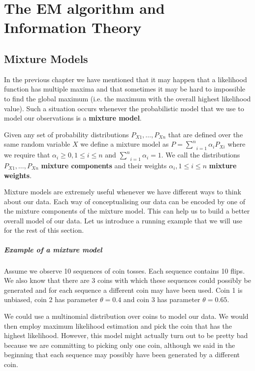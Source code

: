 \chapter{The EM algorithm and Information Theory}

\section{Mixture Models}\label{sec:mixtureModels}

In the previous chapter we have mentioned that it may happen that a likelihood function has multiple 
maxima and that sometimes it may be hard to impossible to find the global maximum (i.e. the maximum
with the overall highest likelihood value). Such a situation occurs whenever the probabilistic model
that we use to model our observations is a \textbf{mixture model}.

\begin{Definition}\label{def:mixtureModel}
Given any set of probability distributions $ P_{X1}, \ldots, P_{Xn} $ that are defined over the same
random variable $ X $ we define a mixture model as
$ P = \underset{i=1}{\overset{n}{\sum}} \alpha_{i}P_{Xi} $
where we require that $ \alpha_{i} \geq 0, 1 \leq i \leq n $ and 
$ \underset{i=1}{\overset{n}{\sum}} \alpha_{i} = 1 $.
We call the distributions $ P_{X1}, \ldots, P_{Xn} $ \textbf{mixture components} and their weights
$ \alpha_{i}, 1 \leq i \leq n $ \textbf{mixture weights}.
\end{Definition}

Mixture models are extremely useful whenever we have different ways to think about our data. Each way
of conceptualising our data can be encoded by one of the mixture components of the mixture model.
This can help us to build a better overall model of our data. Let us introduce a running example that
we will use for the rest of this section. 

\paragraph{Example of a mixture model} Assume we observe 10 sequences of coin tosses. Each sequence
contains 10 flips. We also know that there are 3 coins with which these sequences could possibly be
generated and for each sequence a different coin may have been used. Coin 1 is unbiased, coin 2 has
parameter $ \theta = 0.4 $ and coin 3 has parameter $ \theta = 0.65 $. 
 
We could use 
a multinomial distribution over coins to model our data. We would then employ maximum likelihood estimation 
and pick the coin that has the highest likelihood. However, this model might actually turn out to be
pretty bad because we are committing to picking only one coin, although we said in the beginning that
each sequence may possibly have been generated by a different coin. 

